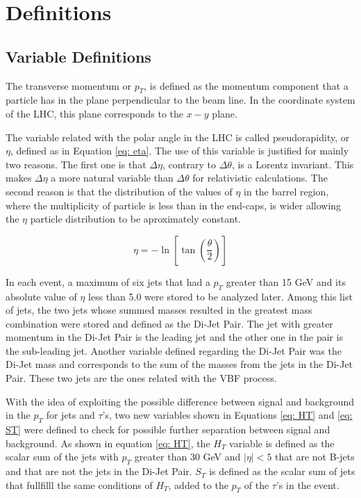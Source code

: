 \chapter{Definitions} \label{sec:definitions}

\section{Variable Definitions}

The transverse momentum or $p_{T}$, is defined as the momentum component that a particle has in the plane perpendicular to the beam line. In the coordinate system of the LHC, this plane corresponds to the $x-y$ plane.

The variable related with the polar angle in the LHC is called pseudorapidity, or $\eta$, defined as in Equation \ref{eq: eta}. The use of this variable is justified for mainly two reasons. The first one is that $\Delta \eta$, contrary to $\Delta \theta$, is a Lorentz invariant. This makes $\Delta \eta$ a more natural variable than $\Delta \theta$ for relativistic calculations. The second reason is that the distribution of the values of $\eta$ in the barrel region, where the multiplicity of particle is less than in the end-caps, is wider allowing the $\eta$ particle distribution to be aproximately constant.

\begin{equation}
 \eta = -\ln\left[\tan\left(\frac{\theta}{2}\right)\right]
 \label{eq: eta}
\end{equation}

In each event, a maximum of six jets that had a $p_{T}$ greater than 15 GeV and its absolute value of $\eta$ less than 5.0 were stored to be analyzed later. Among this list of jets, the two jets whose summed masses resulted in the greatest mass combination were stored and defined as the Di-Jet Pair. The jet with greater momentum in the Di-Jet Pair is the leading jet and the other one in the pair is the sub-leading jet. Another variable defined regarding the Di-Jet Pair was the Di-Jet mass and corresponds to the sum of the masses from the jets in the Di-Jet Pair. These two jets are the ones related with the VBF process. 

With the idea of exploiting the possible difference between signal and background in the $p_{T}$ for jets and $\tau$'s, two new variables shown in Equations \ref{eq: HT} and \ref{eq: ST} were defined to check for possible further separation between signal and background. As shown in equation \ref{eq: HT}, the $H_{T}$ variable is defined as the scalar sum of the jets with $p_{T}$ greater than 30 GeV and $|\eta| < 5$ that are not B-jets and that are not the jets in the Di-Jet Pair. $S_{T}$ is defined as the scalar sum of jets that fullfilll the same conditions of $H_{T}$, added to the $p_{T}$ of the $\tau$'s in the event.

